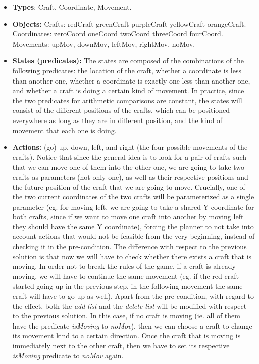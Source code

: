 \documentclass{article}
\begin{document}
\begin{enumerate}
\begin{itemize}
    \color{blue}
    \item \textbf{Types}: \color{black} Craft, Coordinate, \color{blue}Movement\color{black}.
    \color{blue}
    \item \textbf{Objects:} Crafts: \color{black} redCraft greenCraft purpleCraft yellowCraft orangeCraft. Coordinates: zeroCoord oneCoord twoCoord threeCoord fourCoord. \color{blue} Movements: upMov, downMov, leftMov, rightMov, noMov.
    \color{blue}
    \item \textbf{States (predicates):} \color{black}The states are composed of the combinations of the following predicates: the location of the craft, whether a coordinate is less than another one, whether a coordinate is exactly one less than another one, \color{blue} and whether a craft is doing a certain kind of movement\color{black}. In practice, since the two predicates for arithmetic comparisons are constant, the states will consist of the different positions of the crafts, which can be positioned everywhere as long as they are in different position, \color{blue} and the kind of movement that each one is doing.
    \color{black}
    \item \textbf{Actions:} (go) up, down, left, and right (the four possible movements of the crafts). Notice that since the general idea is to look for a pair of crafts such that we can move one of them into the other one, we are going to take two crafts as parameters (not only one), as well as their respective positions and the future position of the craft that we are going to move. Crucially, one of the two current coordinates of the two crafts will be parameterized as a single parameter (eg. for moving left, we are going to take a shared Y coordinate for both crafts, since if we want to move one craft into another by moving left they should have the same Y coordinate), forcing the planner to not take into account actions that would not be feasible from the very beginning, instead of checking it in the pre-condition. \color{blue} The difference with respect to the previous solution is that now we will have to check whether there exists a craft that is moving. In order not to break the rules of the game, if a craft is already moving, we will have to continue the same movement (eg. if the red craft started going up in the previous step, in the following movement the same craft will have to go up as well). Apart from the pre-condition, with regard to the effect, both the \textit{add list} and the \textit{delete list} will be modified with respect to the previous solution. In this case, if no craft is moving (ie. all of them have the predicate \textit{isMoving} to \textit{noMov}), then  we can choose a craft to change its movement kind to a certain direction. Once the craft that is moving is immediately next to the other craft, then we have to set its respective \textit{isMoving} predicate to \textit{noMov} again.
    

\end{itemize}
\end{enumerate}
\end{document}
